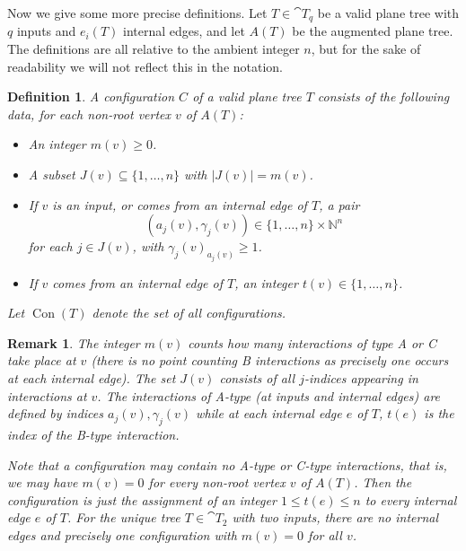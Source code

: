 \documentclass[english,letter paper,12pt,leqno]{article}
\theoremstyle{example}
\newtheorem{definition}[theorem]{Definition}
\newtheorem{remark}[theorem]{Remark}
\numberwithin{equation}{section}
\begin{document}
Now we give some more precise definitions. Let $T \in \cat{T}_q$ be a valid plane tree with $q$ inputs and $e_i(T)$ internal edges, and let $A(T)$ be the augmented plane tree. The definitions are all relative to the ambient integer $n$, but for the sake of readability we will not reflect this in the notation.

\begin{definition}\label{defn:config} A \emph{configuration} $C$ of a valid plane tree $T$ consists of the following data, for each non-root vertex $v$ of $A(T)$:
\begin{itemize}
\item An integer $m(v) \ge 0$.
\item A subset $J(v) \subseteq \{ 1,\ldots, n \}$ with $|J(v)| = m(v)$. 
\item If $v$ is an input, or comes from an internal edge of $T$, a pair
\[
( a_j(v), \gamma_j(v) ) \in \{ 1, \ldots, n \} \times \mathbb{N}^n
\]
for each $j \in J(v)$, with $\gamma_j(v)_{a_j(v)} \ge 1$.
\item If $v$ comes from an internal edge of $T$, an integer $t(v) \in \{1,\ldots,n\}$.
\end{itemize}
Let $\operatorname{Con}(T)$ denote the set of all configurations.
\end{definition} 

\begin{remark}\label{remark:config_count} The integer $m(v)$ counts how many interactions of type A or C take place at $v$ (there is no point counting B interactions as precisely one occurs at each internal edge). The set $J(v)$ consists of all $j$-indices appearing in interactions at $v$. The interactions of A-type (at inputs and internal edges) are defined by indices $a_j(v), \gamma_j(v)$ while at each internal edge $e$ of $T$, $t(e)$ is the index of the B-type interaction.

Note that a configuration may contain no A-type or C-type interactions, that is, we may have $m(v) = 0$ for every non-root vertex $v$ of $A(T)$. Then the configuration is just the assignment of an integer $1 \le t(e) \le n$ to every internal edge $e$ of $T$. For the unique tree $T \in \cat{T}_2$ with two inputs, there are no internal edges and precisely one configuration with $m(v) = 0$ for all $v$.
\end{remark}
\end{document}

